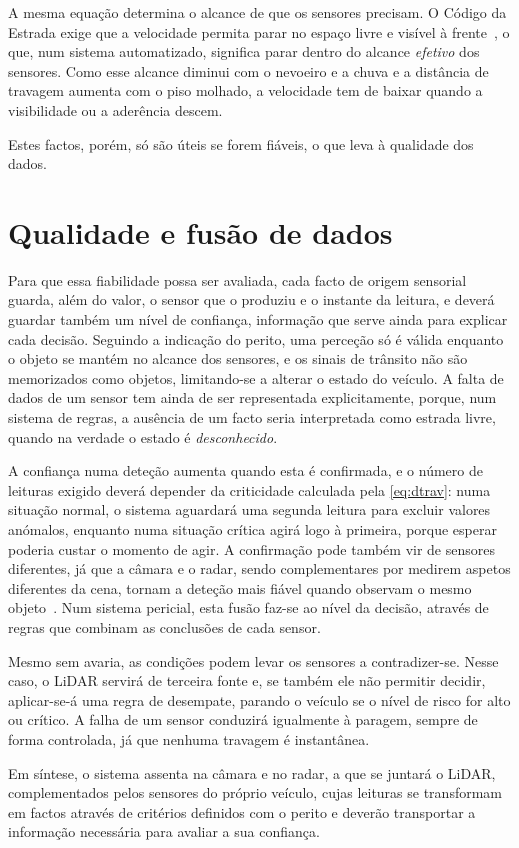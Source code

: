 A mesma equação determina o alcance de que os sensores precisam. O Código
da Estrada exige que a velocidade permita parar no espaço livre e visível à
frente~\cite{codigoestrada}, o que, num sistema automatizado, significa parar
dentro do alcance \emph{efetivo} dos sensores. Como esse alcance diminui
com o nevoeiro e a chuva e a distância de travagem aumenta
com o piso molhado, a velocidade tem de baixar quando a visibilidade ou a
aderência descem.

Estes factos, porém, só são úteis se forem fiáveis, o que leva à qualidade
dos dados.

\section{Qualidade e fusão de dados}
\label{sec:sensores-qualidade}

Para que essa fiabilidade possa ser avaliada, cada facto de origem sensorial
guarda, além do valor, o sensor que o produziu e o instante da leitura, e
deverá guardar também um nível de confiança, informação que serve ainda para
explicar cada decisão.
Seguindo a indicação do perito, uma perceção só é válida enquanto o objeto
se mantém no alcance dos sensores, e os sinais de trânsito não são
memorizados como objetos, limitando-se a alterar o estado do veículo. A
falta de dados de um sensor tem ainda de ser representada explicitamente,
porque, num sistema de regras, a ausência de um facto seria interpretada
como estrada livre, quando na verdade o estado é \emph{desconhecido}.

A confiança numa deteção aumenta quando esta é confirmada, e o número de
leituras exigido deverá depender da criticidade calculada pela \cref{eq:dtrav}: numa
situação normal, o sistema aguardará uma segunda leitura para excluir valores
anómalos, enquanto numa situação crítica agirá logo à primeira, porque esperar
poderia custar o momento de agir. A confirmação pode também vir de sensores
diferentes, já que a câmara e o radar, sendo complementares por medirem
aspetos diferentes da cena, tornam a deteção mais fiável quando observam o
mesmo objeto~\cite{castanedo2013}. Num sistema pericial, esta fusão faz-se
ao nível da decisão, através de regras que combinam as conclusões de cada
sensor.

Mesmo sem avaria, as condições podem levar os sensores a contradizer-se.
Nesse caso, o LiDAR servirá de terceira fonte e, se também ele não permitir
decidir, aplicar-se-á uma regra de desempate, parando o veículo se o nível de
risco for alto ou crítico. A falha de um sensor conduzirá igualmente à
paragem, sempre de forma controlada, já que nenhuma travagem é instantânea.

Em síntese, o sistema assenta na câmara e no radar, a que se juntará o LiDAR,
complementados pelos sensores do próprio veículo, cujas leituras se
transformam em factos através de critérios definidos com o perito e deverão
transportar a informação necessária para avaliar a sua confiança.
